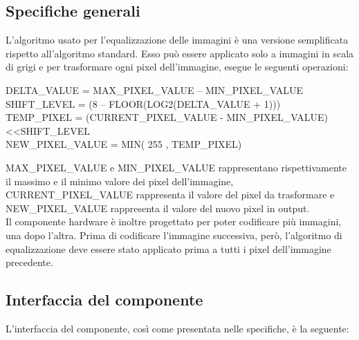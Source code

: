 \documentclass[12pt, table, xcdraw]{article}
\begin{document}
\subsection{Specifiche generali}
L'algoritmo usato per l'equalizzazione delle immagini è una versione semplificata rispetto all'algoritmo standard. Esso può essere applicato solo a immagini in scala di grigi e per trasformare ogni pixel dell'immagine, esegue le seguenti operazioni:

\begin{flushleft}
DELTA\_VALUE = MAX\_PIXEL\_VALUE – MIN\_PIXEL\_VALUE \\
SHIFT\_LEVEL = (8 – FLOOR(LOG2(DELTA\_VALUE + 1))) \\
TEMP\_PIXEL = (CURRENT\_PIXEL\_VALUE - MIN\_PIXEL\_VALUE) \textless\textless  SHIFT\_LEVEL \\
NEW\_PIXEL\_VALUE = MIN( 255 , TEMP\_PIXEL) \\
\end{flushleft}

MAX\_PIXEL\_VALUE e MIN\_PIXEL\_VALUE rappresentano rispettivamente il massimo e il minimo valore dei pixel dell'immagine, CURRENT\_PIXEL\_VALUE rappresenta il valore del pixel da trasformare e NEW\_PIXEL\_VALUE rappresenta il valore del nuovo pixel in output. \\

Il componente hardware è inoltre progettato per poter codificare più immagini, una dopo l'altra. Prima di codificare l'immagine successiva, però, l'algoritmo di equalizzazione deve essere stato applicato prima a tutti i pixel dell'immagine precedente.

\newpage
\subsection{Interfaccia del componente}
L’interfaccia del componente, così come presentata nelle specifiche, è la seguente:
\end{document}
